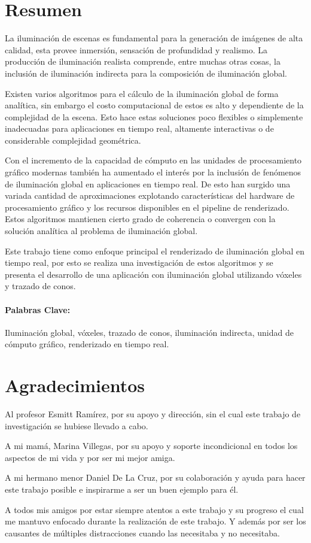 \section*{Resumen}
La iluminación de escenas es fundamental para la generación de imágenes de alta calidad, esta provee inmersión, sensación de profundidad y realismo. La producción de iluminación realista comprende, entre muchas otras cosas, la inclusión de iluminación indirecta para la composición de iluminación global.

Existen varios algoritmos para el cálculo de la iluminación global de forma analítica, sin embargo el costo computacional de estos es alto y dependiente de la complejidad de la escena. Esto hace estas soluciones poco flexibles o simplemente inadecuadas para aplicaciones en tiempo real, altamente interactivas o de considerable complejidad geométrica. 

Con el incremento de la capacidad de cómputo en las unidades de procesamiento gráfico modernas también ha aumentado el interés por la inclusión de fenómenos de iluminación global en aplicaciones en tiempo real. De esto han surgido una variada cantidad de aproximaciones explotando características del hardware de procesamiento gráfico y los recursos disponibles en el pipeline de renderizado. Estos algoritmos mantienen cierto grado de coherencia o convergen con la solución analítica al problema de iluminación global. 

Este trabajo tiene como enfoque principal el renderizado de iluminación global en tiempo real, por esto se realiza una investigación de estos algoritmos y se presenta el desarrollo de una aplicación con iluminación global utilizando vóxeles y trazado de conos.
\paragraph{Palabras Clave:}
Iluminación global, vóxeles, trazado de conos, iluminación indirecta, unidad de cómputo gráfico, renderizado en tiempo real.

\newpage
\section*{Agradecimientos}

Al profesor Esmitt Ramírez, por su apoyo y dirección, sin el cual este trabajo de investigación se hubiese llevado a cabo.

A mi mamá, Marina Villegas, por su apoyo y soporte incondicional en todos los aspectos de mi vida y por ser mi mejor amiga. 

A mi hermano menor Daniel De La Cruz, por su colaboración y ayuda para hacer este trabajo posible e inspirarme a ser un buen ejemplo para él.

A todos mis amigos por estar siempre atentos a este trabajo y su progreso el cual me mantuvo enfocado durante la realización de este trabajo. Y además por ser los causantes de múltiples distracciones cuando las necesitaba y no necesitaba.